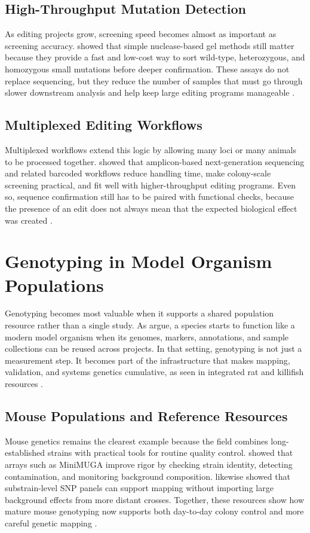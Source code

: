 \documentclass{article}
\begin{document}
\subsection{High-Throughput Mutation Detection}
As editing projects grow, screening speed becomes almost as important as screening accuracy. \textcite{zheng2022simple} showed that simple nuclease-based gel methods still matter because they provide a fast and low-cost way to sort wild-type, heterozygous, and homozygous small mutations before deeper confirmation. These assays do not replace sequencing, but they reduce the number of samples that must go through slower downstream analysis and help keep large editing programs manageable \parencite{limaye2023genotyping}.

\subsection{Multiplexed Editing Workflows}
Multiplexed workflows extend this logic by allowing many loci or many animals to be processed together. \textcite{lu2024identification} showed that amplicon-based next-generation sequencing and related barcoded workflows reduce handling time, make colony-scale screening practical, and fit well with higher-throughput editing programs. Even so, sequence confirmation still has to be paired with functional checks, because the presence of an edit does not always mean that the expected biological effect was created \parencite{byambaa2020generation,limaye2023genotyping}.

\section{Genotyping in Model Organism Populations}
Genotyping becomes most valuable when it supports a shared population resource rather than a single study. As \textcite{matthews2020turn} argue, a species starts to function like a modern model organism when its genomes, markers, annotations, and sample collections can be reused across projects. In that setting, genotyping is not just a measurement step. It becomes part of the infrastructure that makes mapping, validation, and systems genetics cumulative, as seen in integrated rat and killifish resources \parencite{zinski2021genome,poeschla2020turquoise}.

\subsection{Mouse Populations and Reference Resources}
Mouse genetics remains the clearest example because the field combines long-established strains with practical tools for routine quality control. \textcite{sigmon2020content} showed that arrays such as MiniMUGA improve rigor by checking strain identity, detecting contamination, and monitoring background composition. \textcite{miura2022characterization} likewise showed that substrain-level SNP panels can support mapping without importing large background effects from more distant crosses. Together, these resources show how mature mouse genotyping now supports both day-to-day colony control and more careful genetic mapping \parencite{kockum2023overview}.
\end{document}
